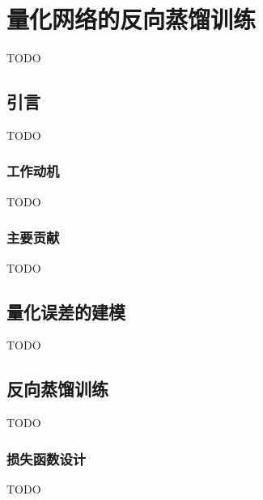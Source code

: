 \chapter{量化网络的反向蒸馏训练}
TODO

\section{引言}
TODO
\subsection{工作动机}
TODO
\subsection{主要贡献}
TODO

\section{量化误差的建模}
TODO

\section{反向蒸馏训练}
TODO
\subsection{损失函数设计}
TODO
